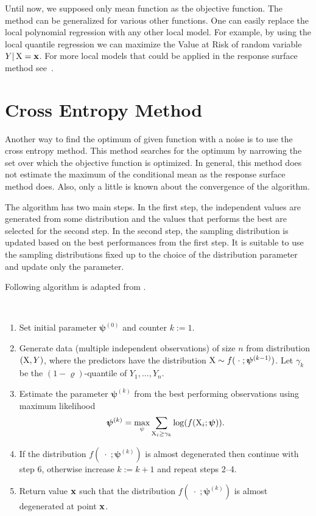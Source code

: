Until now, we supposed only mean function as the objective function. The method can be generalized for various other functions. One can easily replace the local polynomial regression with any other local model. For example, by using the local quantile regression we can maximize the Value at Risk of random variable $Y \vert \operatorname{\bm{X}} = \mathbf{x}$. For more local models that could be applied in the response surface method see~\cite{Fan03}.



\section{Cross Entropy Method}
	\label{chap:crossEntropy}
	
	Another way to find the optimum of given function with a noise is to use the cross entropy method. This method searches for the optimum by narrowing the set over which the objective function is optimized. In general, this method does not estimate the maximum of the conditional mean as the response surface method does. Also, only a little is known about the convergence of the algorithm.
	
	The algorithm has two main steps. In the first step, the independent values are generated from some distribution and the values that performs the best are selected for the second step. In the second step, the sampling distribution is updated based on the best performances from the first step. It is suitable to use the sampling distributions fixed up to the choice of the distribution parameter and update only the parameter.
	
	Following algorithm is adapted from \cite{Kroese11}.

\begin{algorithm}\
	\label{algo:crossEntropy}
	\begin{enumerate}
		\item Set initial parameter $\bm{\psi}^{(0)}$ and counter $k := 1$.
		\item Generate data (multiple independent observations) of size $n$ from distribution $(\operatorname{\bm{X}}, Y)$, where the predictors have the distribution $\operatorname{\bm{X}} \sim f( \;\cdot\; ; \bm{\psi}^{(k-1)})$. Let $\gamma_k$ be the $(1-\varrho)$-quantile of $Y_1, ..., Y_n$.
		\item Estimate the parameter $\bm{\psi}^{(k)}$ from the best performing observations using maximum likelihood
		\[
			\bm{\psi}^{(k)} = \underset{\psi}{\max} \sum_{\operatorname{\bm{X}}_i \geq \gamma_k} \log ( f ( \operatorname{\bm{X}}_i; \bm{\psi} ) ).
		\]
		\item If the distribution $f( \;\cdot\; ; \bm{\psi}^{(k)})$ is almost degenerated then continue with step 6, otherwise increase $k := k+1$ and repeat steps 2--4.
		\item Return value $\mathbf{x}$ such that the distribution $f( \;\cdot\; ; \bm{\psi}^{(k)})$ is almost degenerated at point $\mathbf{x}$.
	\end{enumerate}
\end{algorithm}

